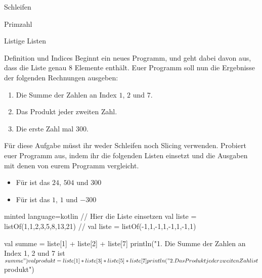 \begin{task}[points=auto]{Schleifen}
\begin{subtask*}[points=0]{Primzahl }
        \begin{solution}
        \end{solution}
    \end{subtask*}
\end{task}
\begin{task}[points=auto]{Listige Listen}
    \begin{subtask*}[points=0]{Definition und Indices }
        Beginnt ein neues Programm, und geht dabei davon aus, dass die Liste
         genau $8$ Elemente enthält. Euer Programm soll
        nun die Ergebnisse der folgenden Rechnungen ausgeben:

        \begin{enumerate}
            \item Die Summe der Zahlen an Index $1$, $2$ und $7$.
            \item Das Produkt jeder zweiten Zahl.
            \item Die erste Zahl mal 300.
        \end{enumerate}

        Für diese Aufgabe müsst ihr weder Schleifen noch Slicing verwenden. Probiert
        euer Programm aus, indem ihr die folgenden Listen einsetzt und die Ausgaben
        mit denen von eurem Programm vergleicht.

        \begin{itemize}
            \item Für  ist das $24$, $504$ und $300$
            \item Für  ist das $1$, $1$ und $-300$
        \end{itemize}

        \begin{solution}
            \begin{codeBlock}[]{minted language=kotlin}
                // Hier die Liste einsetzen
                val liste = listOf(1,1,2,3,5,8,13,21)
                // val liste = listOf(-1,1,-1,1,-1,1,-1,1)

                val summe = liste[1] + liste[2] + liste[7]
                println("1. Die Summe der Zahlen an Index 1, 2 und 7 ist $summe")

                val produkt = liste[1] * liste[3] * liste[5] * liste[7]
                println("2. Das Produkt jeder zweiten Zahl ist $produkt")


\end{codeBlock}
\end{solution}
\end{subtask*}
\end{task}
